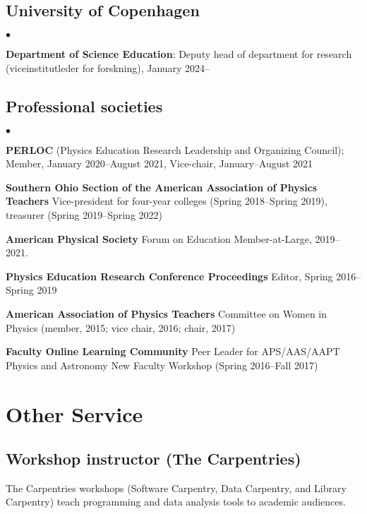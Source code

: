 \documentclass[a4paper,10pt]{article}
\newcommand{\squishlist}{
	\begin{list}{$\bullet$}
		{ \setlength{\itemsep}{0pt}
			\setlength{\parsep}{3pt}
			\setlength{\topsep}{3pt}
			\setlength{\partopsep}{0pt}
			\setlength{\labelwidth}{1em}
			\setlength{\labelsep}{0.5em} } }
\newcommand{\squishend}{
\end{list}  }
\begin{document}
\subsection*{University of Copenhagen}
\squishlist
\item \textbf{Department of Science Education}: Deputy head of department for research (viceinstitutleder for forskning), January 2024--
\squishend

\subsection*{Professional societies}
\squishlist
\item \textbf{PERLOC} (Physics Education Research Leadership and Organizing Council); Member, January 2020--August 2021, Vice-chair, January--August 2021

\item \textbf{Southern Ohio Section of the American Association of Physics Teachers} Vice-president for four-year colleges (Spring 2018--Spring 2019), treasurer (Spring 2019--Spring 2022)

\item \textbf{American Physical Society} Forum on Education Member-at-Large, 2019--2021.

\item \textbf{Physics Education Research Conference Proceedings} Editor, Spring 2016--Spring 2019

\item \textbf{American Association of Physics Teachers} Committee on Women in Physics (member, 2015; vice chair, 2016; chair, 2017)

\item \textbf{Faculty Online Learning Community} Peer Leader for APS/AAS/AAPT Physics and Astronomy New Faculty Workshop (Spring 2016--Fall 2017)
\squishend



\section*{Other Service}

\subsection*{Workshop instructor (The Carpentries)}

The Carpentries workshops (Software Carpentry, Data Carpentry, and Library Carpentry) teach programming and data analysis tools to academic audiences. 
\end{document}
